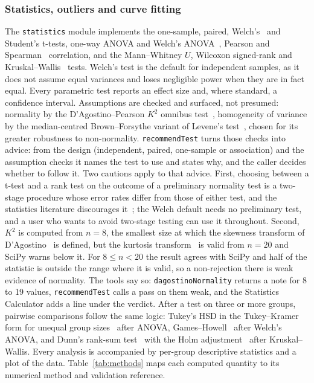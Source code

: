 \documentclass[11pt,a4paper]{article}
\begin{document}
\subsubsection{Statistics, outliers and curve fitting}

The \texttt{statistics} module implements the one-sample, paired,
Welch's~\cite{welch1947} and Student's t-tests, one-way ANOVA and Welch's
ANOVA~\cite{welch1951}, Pearson and Spearman~\cite{spearman1904} correlation,
and the Mann--Whitney $U$, Wilcoxon signed-rank and
Kruskal--Wallis~\cite{kruskal1952} tests. Welch's test is the
default for independent samples, as it does not assume equal variances and loses
negligible power when they are in fact equal. Every parametric test reports an
effect size and, where standard, a confidence interval. Assumptions are checked and surfaced, not presumed: normality by the
D'Agostino--Pearson $K^2$ omnibus test~\cite{dagostino1973}, homogeneity of
variance by the median-centred Brown--Forsythe variant of Levene's
test~\cite{brown1974}, chosen for its greater robustness to non-normality.
\texttt{recommendTest} turns those checks into advice: from the design
(independent, paired, one-sample or association) and the assumption checks it
names the test to use and states why, and the caller decides whether to follow
it. Two cautions apply to that advice. First, choosing between a t-test and a
rank test on the outcome of a preliminary normality test is a two-stage
procedure whose error rates differ from those of either test, and the
statistics literature discourages it~\cite{rochon2012,fagerland2012}; the Welch
default needs no preliminary test, and a user who wants to avoid two-stage
testing can use it throughout. Second, $K^2$ is computed from $n = 8$, the
smallest size at which the skewness transform of
D'Agostino~\cite{dagostino1970} is defined, but the kurtosis
transform~\cite{anscombe1983} is valid from $n = 20$ and SciPy warns below it.
For $8 \leq n < 20$ the result agrees with SciPy and half of the statistic is
outside the range where it is valid, so a non-rejection there is weak evidence of normality. The tools say so: \texttt{dagostinoNormality} returns a note for 8 to 19 values, \texttt{recommendTest} calls a pass on them weak, and the Statistics Calculator adds a line under the verdict. After a test on three or more groups, pairwise comparisons follow the same
logic: Tukey's HSD in the Tukey--Kramer form for unequal group
sizes~\cite{tukey1949,kramer1956} after ANOVA, Games--Howell~\cite{games1976}
after Welch's ANOVA, and Dunn's rank-sum test~\cite{dunn1964} with the Holm
adjustment~\cite{holm1979} after Kruskal--Wallis. Every analysis is accompanied
by per-group descriptive statistics and a plot of the data.
Table~\ref{tab:methods} maps each computed quantity to its numerical method and
validation reference.
\end{document}
